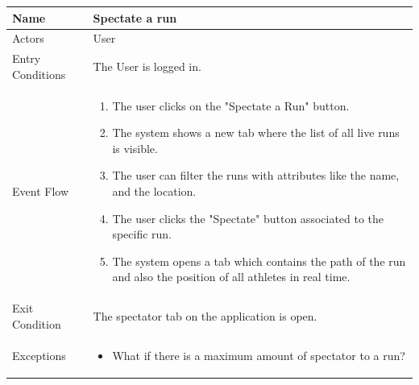 \begin{enumerate}
\FloatBarrier
\begin{table}[h]
\begin{tabular}{|l|l|}
\hline
Name             & Spectate a run \\ \hline
Actors           & User  \\ \hline
Entry Conditions & The User is logged in.    \\ \hline
Event Flow       & \parbox{.45\textwidth}{\begin{enumerate}
            \item The user clicks on the "Spectate a Run" button.
            \item The system shows a new tab where the list of all live runs is visible.
            \item The user can filter the runs with attributes like the name, and the location.
            \item The user clicks the "Spectate" button associated to the specific run.
            \item The system opens a tab which contains the path of the run and also the position of all athletes in real time.
        \end{enumerate}}\\ \hline
Exit Condition   & The spectator tab on the application is open.\\ \hline
Exceptions       & \parbox{.45\textwidth}  
{\begin{itemize}
\item What if there is a maximum amount of spectator to a run?
\end{itemize}}\\ \hline
\end{tabular}
\end{table}
\FloatBarrier

\end{enumerate}

